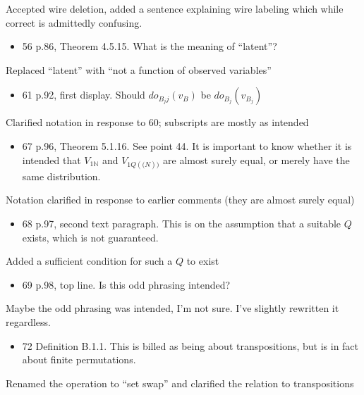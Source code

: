 \documentclass[12pt, a4paper]{article}
\begin{document}
Accepted wire deletion, added a sentence explaining wire labeling which while correct is admittedly confusing.

\begin{itemize}
    \item 56 p.86, Theorem 4.5.15. What is the meaning of ``latent''?
\end{itemize}
 

Replaced ``latent'' with ``not a function of observed variables''

\begin{itemize}
    \item 61 p.92, first display. Should $do_{B_j j}(v_B )$ be $do_{B_j} (v_{B_j} )$
\end{itemize}

Clarified notation in response to 60; subscripts are mostly as intended

\begin{itemize}
    \item 67 p.96, Theorem 5.1.16. See point 44. It is important to know whether it is intended that $V_{1 \mathbb{N}}$ and $V_{1Q( \mathbb(N) )}$ are almost surely equal, or merely have the same distribution.
\end{itemize}

Notation clarified in response to earlier comments (they are almost surely equal)

\begin{itemize}
    \item 68 p.97, second text paragraph. This is on the assumption that a suitable $Q$ exists, which is not guaranteed.
\end{itemize}
 
Added a sufficient condition for such a $Q$ to exist

\begin{itemize}
    \item 69 p.98, top line. Is this odd phrasing intended?
\end{itemize}
 
Maybe the odd phrasing was intended, I'm not sure. I've slightly rewritten it regardless.

\begin{itemize}
    \item 72 Definition B.1.1. This is billed as being about transpositions,
but is in fact about finite permutations.
\end{itemize}

Renamed the operation to ``set swap'' and clarified the relation to transpositions
\end{document}
